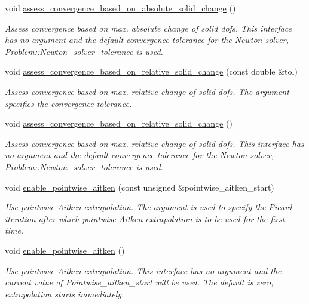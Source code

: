 \begin{DoxyCompactItemize}
void \hyperlink{classoomph_1_1SegregatableFSIProblem_ae10cc55b3dc502ba387695e8c010b0c1}{assess\+\_\+convergence\+\_\+based\+\_\+on\+\_\+absolute\+\_\+solid\+\_\+change} ()
\begin{DoxyCompactList}\small\item\em Assess convergence based on max. absolute change of solid dofs. This interface has no argument and the default convergence tolerance for the Newton solver, \hyperlink{classoomph_1_1Problem_a94536b381e949edf5bb4d44434e08925}{Problem\+::\+Newton\+\_\+solver\+\_\+tolerance} is used. \end{DoxyCompactList}\item 
void \hyperlink{classoomph_1_1SegregatableFSIProblem_abec6313054e23d998b4584f2de80bc52}{assess\+\_\+convergence\+\_\+based\+\_\+on\+\_\+relative\+\_\+solid\+\_\+change} (const double \&tol)
\begin{DoxyCompactList}\small\item\em Assess convergence based on max. relative change of solid dofs. The argument specifies the convergence tolerance. \end{DoxyCompactList}\item 
void \hyperlink{classoomph_1_1SegregatableFSIProblem_af95d2c3833b64d37635e2e07776cef54}{assess\+\_\+convergence\+\_\+based\+\_\+on\+\_\+relative\+\_\+solid\+\_\+change} ()
\begin{DoxyCompactList}\small\item\em Assess convergence based on max. relative change of solid dofs. This interface has no argument and the default convergence tolerance for the Newton solver, \hyperlink{classoomph_1_1Problem_a94536b381e949edf5bb4d44434e08925}{Problem\+::\+Newton\+\_\+solver\+\_\+tolerance} is used. \end{DoxyCompactList}\item 
void \hyperlink{classoomph_1_1SegregatableFSIProblem_a08c87f24c9e3ea80182a4b19d3a9fa92}{enable\+\_\+pointwise\+\_\+aitken} (const unsigned \&pointwise\+\_\+aitken\+\_\+start)
\begin{DoxyCompactList}\small\item\em Use pointwise Aitken extrapolation. The argument is used to specify the Picard iteration after which pointwise Aitken extrapolation is to be used for the first time. \end{DoxyCompactList}\item 
void \hyperlink{classoomph_1_1SegregatableFSIProblem_a3f52d9c6555b43d8ada274ec80940c13}{enable\+\_\+pointwise\+\_\+aitken} ()
\begin{DoxyCompactList}\small\item\em Use pointwise Aitken extrapolation. This interface has no argument and the current value of Pointwise\+\_\+aitken\+\_\+start will be used. The default is zero, extrapolation starts immediately. \end{DoxyCompactList}\item 

\end{DoxyCompactItemize}
